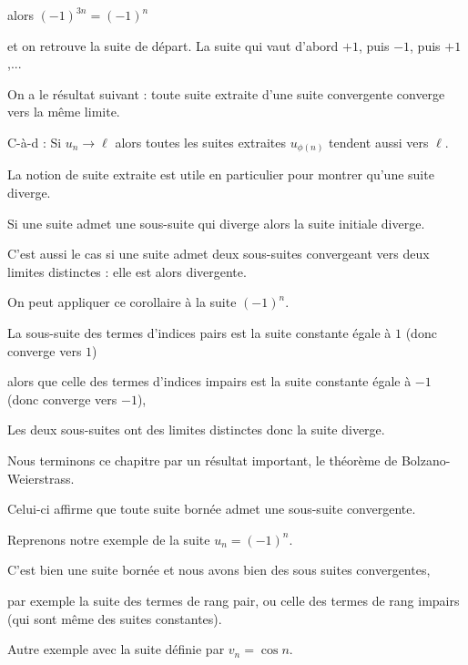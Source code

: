 alors $(-1) ^{3n}= (-1)^n$ 

\change

\change

et on retrouve la suite de départ.
La suite qui vaut d'abord $+1$, puis $-1$, puis $+1$,...

 \diapo

On a le résultat suivant : toute suite extraite d'une suite 
convergente converge vers la même limite.

C-à-d : Si $u_n \to \ell$ alors toutes les suites extraites $u_{\phi(n)}$ 
tendent aussi vers $\ell$.

\change

La notion de suite extraite est utile en particulier 
pour montrer qu'une suite diverge. 

Si une suite admet une sous-suite qui diverge alors la suite initiale diverge.

C'est aussi le cas si une suite admet deux sous-suites 
convergeant vers deux limites distinctes : elle est alors divergente.

\change

On peut appliquer ce corollaire à la suite $(-1)^n$.


La sous-suite des termes d'indices pairs est la suite constante égale à $1$ (donc converge vers $1$)

alors que celle des termes d'indices impairs est la suite constante égale à $-1$ (donc converge vers $-1$),

Les deux  sous-suites ont des limites distinctes donc la suite diverge.


 \diapo

 Nous terminons ce chapitre par un résultat important, 
 le théorème de Bolzano-Weierstrass.


 Celui-ci affirme que toute suite bornée admet une sous-suite convergente.

 
 
 \change
 
 Reprenons notre exemple de la suite $u_n = (-1)^n$.
 
C'est bien une suite bornée et nous avons
bien des sous suites convergentes,

par exemple la suite des termes de rang pair, ou celle des termes de rang impairs
(qui sont même des suites constantes).

\change

Autre exemple avec la suite définie par $v_n = \cos n$.

